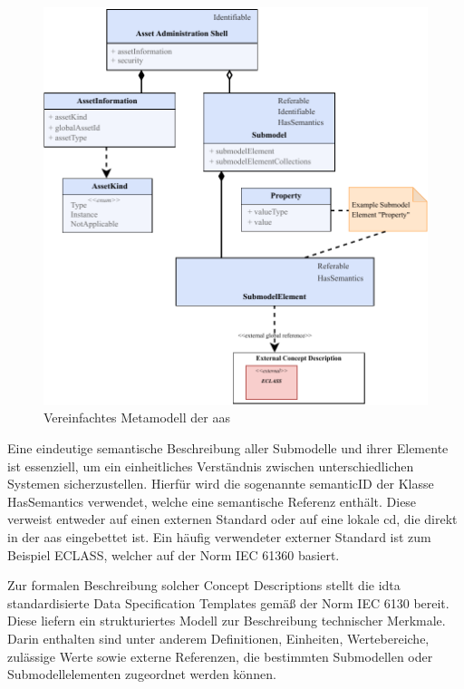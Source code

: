 \newpage
\begin{figure}[htbp]
    \centering
    \includegraphics[width=1\textwidth]{Bilder/Metamodell/MetamodellFarbig.pdf}
    \caption{Vereinfachtes Metamodell der \acs{aas}}
    \label{fig:MetamodellAAS}
\end{figure}

Eine eindeutige semantische Beschreibung aller Submodelle und ihrer Elemente ist essenziell, um ein einheitliches Verständnis zwischen unterschiedlichen Systemen sicherzustellen.
Hierfür wird die sogenannte semanticID der Klasse HasSemantics verwendet, welche eine semantische Referenz enthält.
Diese verweist entweder auf einen externen Standard oder auf eine lokale \ac{cd}, die direkt in der \acs{aas} eingebettet ist.
Ein häufig verwendeter externer Standard ist zum Beispiel ECLASS, welcher auf der Norm IEC 61360 \cite{ECLASSIEC61360} basiert.

Zur formalen Beschreibung solcher Concept Descriptions stellt die \acs{idta} standardisierte Data Specification Templates gemäß der Norm IEC 6130 \cite{SpezifikationPart3a} bereit.
Diese liefern ein strukturiertes Modell zur Beschreibung technischer Merkmale.
Darin enthalten sind unter anderem Definitionen, Einheiten, Wertebereiche, zulässige Werte sowie externe Referenzen, die bestimmten Submodellen oder Submodellelementen zugeordnet werden können.

